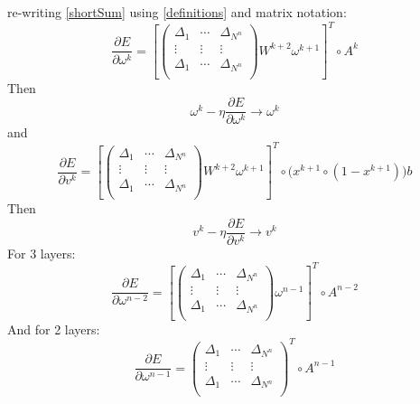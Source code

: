 \documentclass{amsart}
\begin{document}
%
re-writing \eqref{shortSum} using \eqref{definitions} and matrix notation:
%
\begin{equation*}
\frac{\partial E}{\partial \omega^k} = 
\left [
\left (
\begin{array}{ccc}
\Delta_1 & \cdots & \Delta_{N^n} \\
\vdots & \vdots & \vdots \\
\Delta_1 & \cdots & \Delta_{N^n} \\
\end{array}
\right )
W^{k+2} \omega^{k+1}
\right]^T \circ A^k
\end{equation*}
%
Then
%
\begin{equation*}
\omega^k - \eta \frac{\partial E}{\partial \omega^k} \rightarrow \omega^k
\end{equation*}
%
and
%
\begin{equation*}
\frac{\partial E}{\partial v^k} = 
\left [
\left (
\begin{array}{ccc}
\Delta_1 & \cdots & \Delta_{N^n} \\
\vdots & \vdots & \vdots \\
\Delta_1 & \cdots & \Delta_{N^n} \\
\end{array}
\right )
W^{k+2} \omega^{k+1}
\right]^T \circ \big(x^{k+1} \circ (1 - x^{k+1}) \big) b
\end{equation*}
%
Then
%
\begin{equation*}
v^k - \eta \frac{\partial E}{\partial v^k} \rightarrow v^k
\end{equation*}
%
For 3 layers:
%
\begin{equation*}
\frac{\partial E}{\partial \omega^{n-2}} = 
\left [
\left (
\begin{array}{ccc}
\Delta_1 & \cdots & \Delta_{N^n} \\
\vdots & \vdots & \vdots \\
\Delta_1 & \cdots & \Delta_{N^n} \\
\end{array}
\right ) \omega^{n-1}
\right ]^T
\circ A^{n-2}
\end{equation*}
%
And for 2 layers:
%
\begin{equation*}
\frac{\partial E}{\partial \omega^{n-1}} = 
\left (
\begin{array}{ccc}
\Delta_1 & \cdots & \Delta_{N^n} \\
\vdots & \vdots & \vdots \\
\Delta_1 & \cdots & \Delta_{N^n} \\
\end{array}
\right )^T
\circ A^{n-1}
\end{equation*}
%
\end{document}
